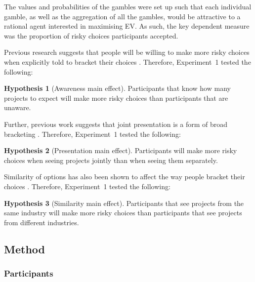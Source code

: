 \documentclass[a4paper, nobind, dvipsnames]{templates/ociamthesis}
\theoremstyle{definition}
\theoremstyle{definition}
\theoremstyle{definition}
\theoremstyle{definition}
\newtheorem{hypothesis}{Hypothesis}[chapter]
\theoremstyle{remark}
\begin{document}
The values and probabilities of the gambles were set up such that each
individual gamble, as well as the aggregation of all the gambles, would be
attractive to a rational agent interested in maximising EV. As such, the key
dependent measure was the proportion of risky choices participants accepted.

Previous research suggests that people will be willing to make more risky
choices when explicitly told to bracket their choices \autocite{sokolhessner2009,sokolhessner2012}. Therefore, Experiment~1 tested the following:

\begin{hypothesis}[Awareness main effect]
\protect\hypertarget{hyp:awareness-aggregation-1}{}{\label{hyp:awareness-aggregation-1} {} }Participants that know how many projects to expect will make more risky choices
than participants that are unaware.
\end{hypothesis}

Further, previous work suggests that joint presentation is a form of broad
bracketing \autocites[e.g.,][]{moher2010,hsee1999}. Therefore, Experiment~1 tested the
following:

\begin{hypothesis}[Presentation main effect]
\protect\hypertarget{hyp:presentation-aggregation-1}{}{\label{hyp:presentation-aggregation-1} {} }Participants will make more risky choices when seeing projects jointly than when
seeing them separately.
\end{hypothesis}

Similarity of options has also been shown to affect the way people bracket their
choices \autocite[e.g.,][]{dekay2005}. Therefore, Experiment~1 tested the following:

\begin{hypothesis}[Similarity main effect]
\protect\hypertarget{hyp:similarity-aggregation-1}{}{\label{hyp:similarity-aggregation-1} {} }Participants that see projects from the same industry will make more risky
choices than participants that see projects from different industries.
\end{hypothesis}

\subsection{Method}

\subsubsection{Participants}
\end{document}
